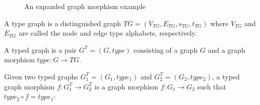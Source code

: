 \begin{example}
\begin{figure}[!ht]
  \centering
  \caption{An expanded graph morphism example}\label{fig:gts:expanded-graph-morphism}
\end{figure}
\end{example}

\begin{definition} A type graph is a distinguished graph $TG = \left(V_{TG},E_{TG},s_{TG},t_{TG}\right)$ where $V_{TG}$ and $E_{TG}$ are called the node and edge type alphabets, respectively.

  A typed graph is a pair $G^T = \left(G, type\right)$ consisting of a graph $G$ and a graph morphism $type : G \rightarrow TG$.

  Given two typed graphs $G^T_1 = \left(G_1,type_1\right)$ and $G^T_2 =\left(G_2,type_2\right)$, a typed graph morphism $f : G^T_1 \rightarrow G^T_2$ is a graph morphism $f : G_1 \rightarrow G_2$ such that $type_2 \circ f = type_1$:

\end{definition}

